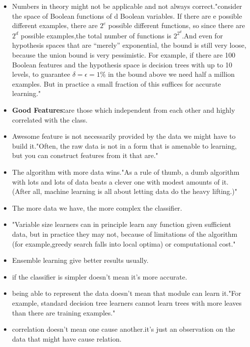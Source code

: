 \documentclass{article}
\begin{document}
\begin{itemize}
	\item Numbers in theory might not be applicable and not always correct."consider the space of Boolean functions of d Boolean variables. If there are e possible different examples, there are \(2^e\) possible different functions, so since there are \(2^d\) possible examples,the total number of functions is \(2^{2^d}\).And even for hypothesis spaces that are “merely” exponential, the bound is still very loose, because the union bound is very pessimistic. For example, if there are 100 Boolean features and the hypothesis space is decision trees with up to 10 levels, to guarantee \(\delta = \epsilon = 1\%\) in the bound above we need half a million examples. But in practice a small fraction of this suffices for accurate learning."
	\item \textbf{Good Features:}are those which independent from each other and highly correlated with the class.
	\item Awesome feature is not necessarily provided by the data we might have to build it."Often, the raw data is not in a form that is amenable to learning, but you can construct features from it that are."
	\item The algorithm with more data wins."As a rule of thumb, a dumb algorithm with lots and lots of data beats a clever one with modest amounts of it. (After all, machine learning is all about letting data do the heavy lifting.)"
	\item The more data we have, the more complex the classifier.
	\item "Variable size learners can in principle learn any function given sufficient data, but in	practice they may not, because of limitations of the algorithm (for example,greedy search falls into local optima) or computational cost."
	\item Ensemble learning give better results usually.
	\item if the classifier is simpler doesn't mean it's more accurate.
	\item being able to represent the data doesn't mean that module can learn it."For example, standard decision tree learners cannot learn trees with more leaves than there are training examples."
	\item correlation doesn't mean one cause another.it's just an observation on the data that might have cause relation.
\end{itemize}
\end{document}
